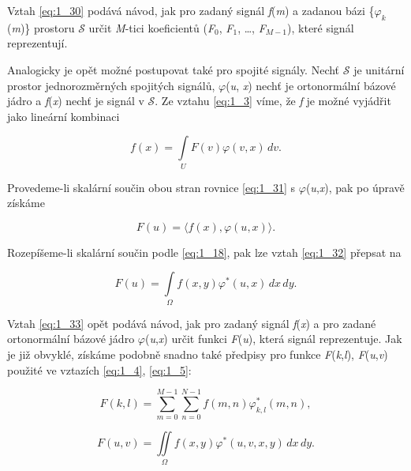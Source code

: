 Vztah \eqref{eq:1_30} podává návod, jak pro zadaný signál \textit{f}(\textit{m}) a zadanou bázi \{$\varphi_k$(\textit{m})\} prostoru $\mathscr{S}$ určit \textit{M}-tici koeficientů (\textit{F}$_0$, \textit{F}$_1$, \dots, \textit{F}$_{M-1}$), které signál reprezentují.

Analogicky je opět možné postupovat také pro spojité signály. Nechť $\mathscr{S}$ je unitární prostor jednorozměrných spojitých signálů, $\varphi$(\textit{u}, \textit{x}) nechť je ortonormální bázové jádro a \textit{f}(\textit{x}) nechť je signál v $\mathscr{S}$. Ze vztahu \eqref{eq:1_3} víme, že \textit{f} je možné vyjádřit jako lineární kombinaci

\begin{equation} \label{eq:1_31}
    f(x) = \int\limits_{U} F(v) \varphi(v, x)\, dv.
\end{equation}

Provedeme-li skalární součin obou stran rovnice \eqref{eq:1_31} s $\varphi$(\textit{u},\textit{x}), pak po úpravě získáme

\begin{equation} \label{eq:1_32}
    F(u) = \langle f(x), \varphi(u, x) \rangle.
\end{equation}

Rozepíšeme-li skalární součin podle \eqref{eq:1_18}, pak lze vztah \eqref{eq:1_32} přepsat na

\begin{equation} \label{eq:1_33}
    F(u) = \int\limits_{\Omega} f(x, y) \varphi^*(u, x)\, dx\, dy.
\end{equation}

Vztah \eqref{eq:1_33} opět podává návod, jak pro zadaný signál \textit{f}(\textit{x}) a pro zadané ortonormální bázové jádro $\varphi$(\textit{u},\textit{x}) určit funkci \textit{F}(\textit{u}), která signál reprezentuje. Jak je již obvyklé, získáme podobně snadno také předpisy pro funkce \textit{F}(\textit{k},\textit{l}), \textit{F}(\textit{u},\textit{v}) použité ve vztazích \eqref{eq:1_4}, \eqref{eq:1_5}:

\begin{equation} \label{eq:1_34}
    F(k, l) = \sum\limits_{m=0}^{M-1} \sum\limits_{n=0}^{N-1} f(m, n) \varphi_{k, l}^*(m, n),
\end{equation}

\begin{equation} \label{eq:1_35}
    F(u, v) = \iint\limits_{\Omega} f(x, y) \varphi^*(u, v, x, y)\, dx\, dy.
\end{equation}

